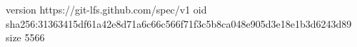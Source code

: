 version https://git-lfs.github.com/spec/v1
oid sha256:31363415df61a42e8d71a6c66c566f71f3c5b8ca048e905d3e18e1b3d6243d89
size 5566
